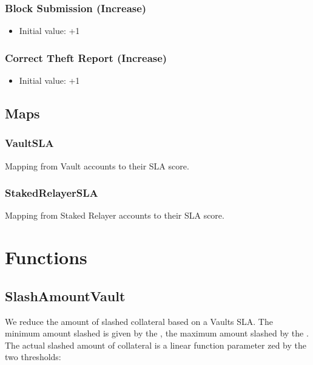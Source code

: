 \documentclass[a4paper,10pt,english]{sphinxmanual}
\begin{document}
\subsubsection{Block Submission (Increase)}
\label{\detokenize{spec/sla:block-submission-increase}}\begin{itemize}
\item {} 
Initial value: +1

\end{itemize}


\subsubsection{Correct Theft Report (Increase)}
\label{\detokenize{spec/sla:correct-theft-report-increase}}\begin{itemize}
\item {} 
Initial value: +1

\end{itemize}


\subsection{Maps}
\label{\detokenize{spec/sla:maps}}

\subsubsection{VaultSLA}
\label{\detokenize{spec/sla:vaultsla}}
Mapping from Vault accounts to their SLA score.


\subsubsection{StakedRelayerSLA}
\label{\detokenize{spec/sla:stakedrelayersla}}
Mapping from Staked Relayer accounts to their SLA score.


\section{Functions}
\label{\detokenize{spec/sla:functions}}

\subsection{SlashAmountVault}
\label{\detokenize{spec/sla:slashamountvault}}\label{\detokenize{spec/sla:id2}}
We reduce the amount of slashed collateral based on a Vaults SLA. The minimum amount slashed is given by the , the maximum amount slashed by the . The actual slashed amount of collateral is a linear function parameter zed by the two thresholds:
\end{document}
